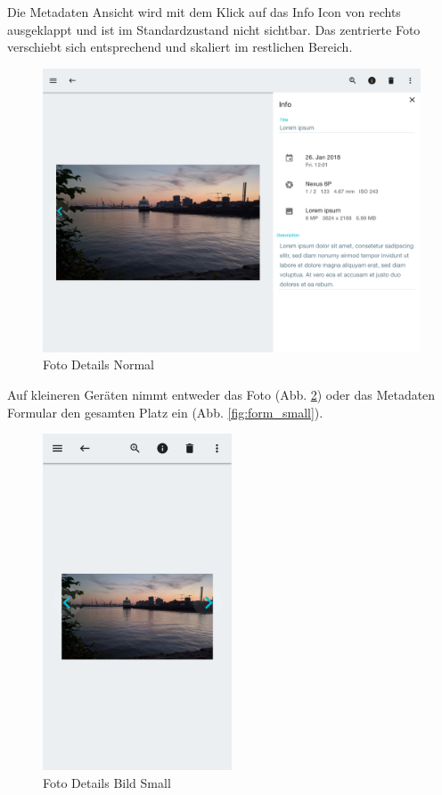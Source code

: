 Die Metadaten Ansicht wird mit dem Klick auf das Info Icon von rechts ausgeklappt und ist im Standardzustand nicht sichtbar. Das zentrierte Foto verschiebt sich entsprechend und skaliert im restlichen Bereich.

\begin{figure}[htp]     %
\centering
\includegraphics[width=1.0\textwidth]{images/form_normal} 
\caption{Foto Details Normal}\label{fig:form_normal}
\end{figure}

Auf kleineren Geräten nimmt entweder das Foto (Abb. \ref{fig:details_small}) oder das Metadaten Formular den gesamten Platz ein (Abb. \ref{fig:form_small}). 

\begin{figure}[htp]     %
\centering
\includegraphics[width=0.5\textwidth]{images/details_small} 
\caption{Foto Details Bild Small}\label{fig:details_small}
\end{figure}

